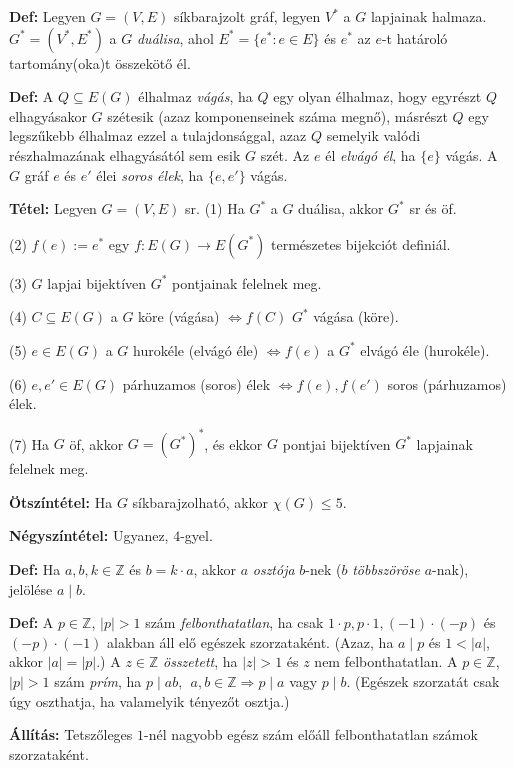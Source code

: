 \documentclass[a4paper, 12pt]{article}
\newcommand{\defi}{{\bf Def:} }
\newcommand{\tetel}{{\bf Tétel:} }
\newcommand{\all}{{\bf Állítás:} }
\newcommand{\Z}{{\mathbb Z}}
\begin{document}
\defi Legyen $G=(V,E)$ síkbarajzolt gráf, legyen $V^*$ a $G$ lapjainak
halmaza.  $G^*=(V^*,E^*)$ a $G$ \emph{duálisa}, ahol $E^*=\{e^*:e\in E\}$
és $e^*$ az $e$-t határoló tartomány(oka)t összekötő él.

\defi A $Q\subseteq E(G)$ élhalmaz \emph{vágás}, ha $Q$ egy olyan élhalmaz,
hogy egyrészt $Q$ elhagyásakor $G$ szétesik (azaz komponenseinek száma
megnő), másrészt $Q$ egy legszűkebb élhalmaz ezzel a tulajdonsággal, azaz
$Q$ semelyik valódi részhalmazának elhagyásától sem esik $G$ szét. Az 
$e$ él \emph{elvágó él}, ha $\{e\}$ vágás. A $G$ gráf $e$ és $e'$ élei
\emph{soros élek}, ha $\{e,e'\}$ vágás.

\tetel Legyen  $G=(V,E)$ sr.
(1) Ha $G^*$ a $G$ duálisa, akkor $G^*$ sr és öf.

(2) $f(e):=e^*$ egy $f:E(G)\to E(G^*)$ természetes bijekciót definiál.

(3) $G$ lapjai bijektíven $G^*$ pontjainak felelnek meg.

(4) $C\subseteq E(G)$ a $G$ köre (vágása) $\iff f(C)$ $G^*$ vágása (köre).

(5) $e\in E(G)$ a $G$ hurokéle (elvágó éle) $\iff f(e)$ a $G^*$ elvágó éle
(hurokéle).

(6) $e,e'\in E(G)$ párhuzamos (soros) élek $\iff f(e), f(e')$ soros
(párhuzamos) élek.


(7) Ha $G$ öf, akkor $G=(G^*)^*$, és ekkor $G$ pontjai bijektíven $G^*$
lapjainak felelnek meg.





{\bf Ötszíntétel:} Ha $G$ síkbarajzolható, akkor $\chi(G)\le 5$.

{\bf Négyszíntétel:} Ugyanez, $4$-gyel.






\defi Ha $a,b,k\in \Z$ és $b=k\cdot a$, akkor $a$ \emph{osztója} $b$-nek
($b$ \emph{többszöröse} $a$-nak), jelölése $a\mid b$.

\defi A $p\in\Z$, $|p|>1$ szám \emph{felbonthatatlan}, ha csak $1\cdot p,
p\cdot 1, (-1)\cdot (-p)$ és $(-p)\cdot (-1)$ alakban áll elő egészek
szorzataként. (Azaz, ha $a\mid p$ és $1<|a|$, akkor $|a|=|p|$.)  A $z\in\Z$
\emph{összetett}, ha $|z|>1$ és $z$ nem felbonthatatlan. A $p\in\Z$,
$|p|>1$ szám \emph{prím}, ha $p\mid ab,~~ a,b\in\Z\Rightarrow p\mid a$ vagy
$p\mid b$.  (Egészek szorzatát csak úgy oszthatja, ha valamelyik tényezőt
osztja.)

\all Tetszőleges $1$-nél nagyobb egész szám előáll felbonthatatlan számok
szorzataként. 
\end{document}
